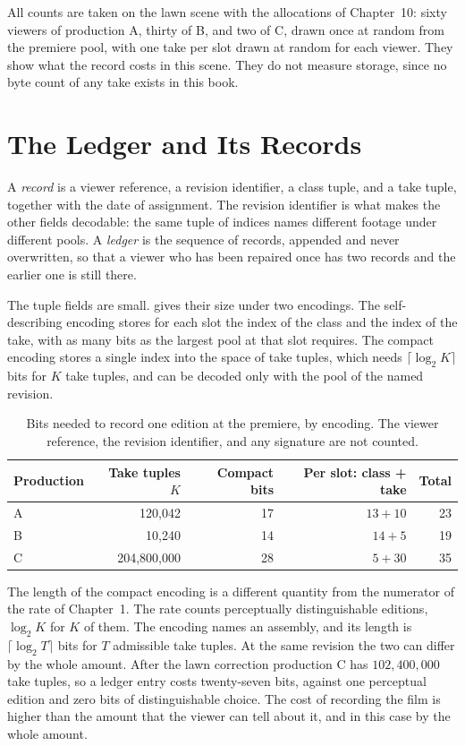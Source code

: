 \documentclass[11pt,twoside,openright]{book}
\theoremstyle{plain}
\theoremstyle{definition}
\theoremstyle{remark}
\begin{document}
All counts are taken on the lawn scene with the allocations of Chapter~10: sixty viewers of production A, thirty of B, and two of C, drawn once at random from the premiere pool, with one take per slot drawn at random for each viewer. They show what the record costs in this scene. They do not measure storage, since no byte count of any take exists in this book.

\section{The Ledger and Its Records}\label{sec:records}

A \emph{record} is a viewer reference, a revision identifier, a class tuple, and a take tuple, together with the date of assignment. The revision identifier is what makes the other fields decodable: the same tuple of indices names different footage under different pools. A \emph{ledger} is the sequence of records, appended and never overwritten, so that a viewer who has been repaired once has two records and the earlier one is still there.

The tuple fields are small.  gives their size under two encodings. The self-describing encoding stores for each slot the index of the class and the index of the take, with as many bits as the largest pool at that slot requires. The compact encoding stores a single index into the space of take tuples, which needs $\lceil\log_2 K\rceil$ bits for $K$ take tuples, and can be decoded only with the pool of the named revision.

\begin{table}[ht]
\centering
\begin{tabular}{@{}lrrrr@{}}
\toprule
Production & Take tuples $K$ & Compact bits & Per slot: class + take & Total\\
\midrule
A & 120{,}042 & 17 & $13+10$ & 23\\
B & 10{,}240 & 14 & $14+5$ & 19\\
C & 204{,}800{,}000 & 28 & $5+30$ & 35\\
\bottomrule
\end{tabular}
\caption{Bits needed to record one edition at the premiere, by encoding. The viewer reference, the revision identifier, and any signature are not counted.}\label{tab:rec12}
\end{table}

The length of the compact encoding is a different quantity from the numerator of the rate of Chapter~1. The rate counts perceptually distinguishable editions, $\log_2K$ for $K$ of them. The encoding names an assembly, and its length is $\lceil\log_2T\rceil$ bits for $T$ admissible take tuples. At the same revision the two can differ by the whole amount. After the lawn correction production C has $102{,}400{,}000$ take tuples, so a ledger entry costs twenty-seven bits, against one perceptual edition and zero bits of distinguishable choice. The cost of recording the film is higher than the amount that the viewer can tell about it, and in this case by the whole amount.
\end{document}
